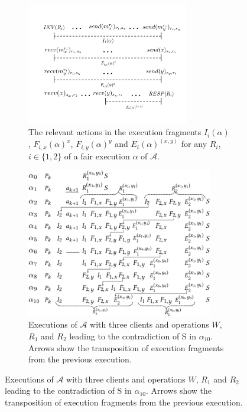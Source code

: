 
\begin{figure}[t]
	\hspace*{-1.2cm}
	\begin{subfigure}{0.45\columnwidth}
		\centering
	     \includegraphics[width=2.8in]{figures/executions_3_2.pdf}
	     \caption{\small{
	      The relevant actions in the execution fragments $I_i(\alpha)$, $F_{i,x}(\alpha)^{x}$,    $F_{i,y}(\alpha)^{y}$ and   $E_{i}(\alpha)^{(x,y)}$ for any \rot{} $R_i$, $i \in \{1, 2\}$
			of a fair execution $\alpha$ of $\mathcal{A}$.
	     }}
	     \label{fig:exe3_fragments}
	\end{subfigure}
	\hspace*{1.0cm}  
	\begin{subfigure}{0.49\columnwidth}
		\centering
		\includegraphics[width=3.2in]{figures/executions_3_1-cropa.pdf}		
		\caption{\small{Executions of $\mathcal{A}$ with three clients and operations $W$, $R_1$ and $R_2$ leading to the contradiction of S in $\alpha_{10}$.
			Arrows show the transposition of execution fragments from the previous execution.
		}}
           	\label{fig:executions3}
	\end{subfigure}   	
\end{figure}
